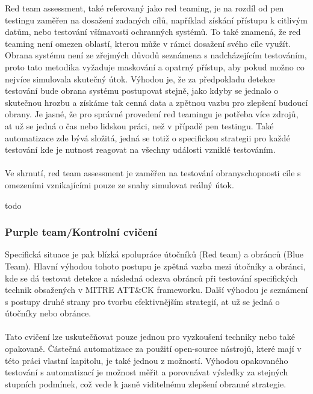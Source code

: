Red team assessment, také referovaný jako red teaming, je na rozdíl od pen testingu zaměřen na dosažení zadaných cílů, například získání přístupu k citlivým datům, nebo testování všímavosti ochranných systémů.
To také znamená, že red teaming není omezen oblastí, kterou může v rámci dosažení svého cíle využít.
Obrana systému není ze zřejmých důvodů seznámena s nadcházejícím testováním, proto tato metodika vyžaduje maskování a opatrný přístup, aby pokud možno co nejvíce simulovala skutečný útok.
Výhodou je, že za předpokladu detekce testování bude obrana systému postupovat stejně, jako kdyby se jednalo o skutečnou hrozbu a získáme tak cenná data a zpětnou vazbu pro zlepšení budoucí obrany.
Je jasné, že pro správné provedení red teamingu je potřeba více zdrojů, at už se jedná o čas nebo lidskou práci, než v případě pen testingu.
Také automatizace zde bývá složitá, jedná se totiž o specifickou strategii pro každé testování kde je nutnost reagovat na všechny události vzniklé testováním.\cite{securityInteligence_pen_test_red_team_purple_team, lootsec_pen_test_vs_red_team, astra_pen_test_vs_red_teaming}

\paragraph{}
Ve shrnutí, red team assessment je zaměřen na testování obranyschopnosti cíle s omezeními vznikajícími pouze ze snahy simulovat reálný útok.

todo\cite{red_team_oakley_2019}

\subsubsection{Purple team/Kontrolní cvičení}
Specifická situace je pak blízká spolupráce útočníků (Red team) a obránců (Blue Team).
Hlavní výhodou tohoto postupu je zpětná vazba mezi útočníky a obránci, kde se dá testovat detekce a následná odezva obránců při testování specifických technik obsažených v MITRE ATT\&CK frameworku.
Další výhodou je seznámení s postupy druhé strany pro tvorbu efektivnějším strategií, at už se jedná o útočníky nebo obránce.
\paragraph{}
Tato cvičení lze uskutečňovat pouze jednou pro vyzkoušení techniky nebo také opakovaně.
Částečná automatizace za použití open-source nástrojů, které mají v této práci vlastní kapitolu, je také jednou z možností.
Výhodou opakovaného testování s automatizací je možnost měřit a porovnávat výsledky za stejných stupních podmínek, což vede k jasně viditelnému zlepšení obranné strategie.\cite{securityInteligence_pen_test_red_team_purple_team,redscan_team_purple_team}

